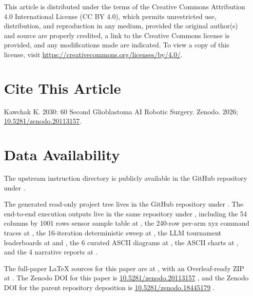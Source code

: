 This article is distributed under the terms of the Creative Commons
Attribution 4.0 International License (CC BY 4.0), which permits
unrestricted use, distribution, and reproduction in any medium,
provided the original author(s) and source are properly credited, a
link to the Creative Commons license is provided, and any
modifications made are indicated. To view a copy of this license,
visit \url{https://creativecommons.org/licenses/by/4.0/}.

{}
\section*{Cite This Article}
\label{sec:cite}

Kawchak K. 2030: 60 Second Glioblastoma AI Robotic Surgery. Zenodo.
2026; \href{https://doi.org/10.5281/zenodo.20113157}{10.5281/zenodo.20113157}.

{}
\section*{Data Availability}
\label{sec:data}

The upstream instruction directory is publicly available
in the  GitHub
repository under
\cite{one-minute-variant-instructions}. 

The generated read-only
project tree lives in the  GitHub
repository under 
\cite{repo-robotic-surgeries}. The end-to-end execution outputs live
in the same repository under , including
the 54 columns by 1001 rows sensor sample table at
, the
240-row per-arm xyz command traces at
, the 16-iteration
deterministic sweep at , the
LLM tournament leaderboards at
 and
, the 6 curated
ASCII diagrams at , the ASCII
charts at , and the 4 narrative
reports at . 

The full-paper
LaTeX sources for this paper are at
, with an Overleaf-ready ZIP at
. The
Zenodo DOI for this paper is
\href{https://doi.org/10.5281/zenodo.20113157}{10.5281/zenodo.20113157}
\cite{kawchak_2026_20113157}, and the Zenodo DOI for the parent
repository deposition is
\href{https://doi.org/10.5281/zenodo.18445179}{10.5281/zenodo.18445179}
\cite{repo-robotic-surgeries}.

 